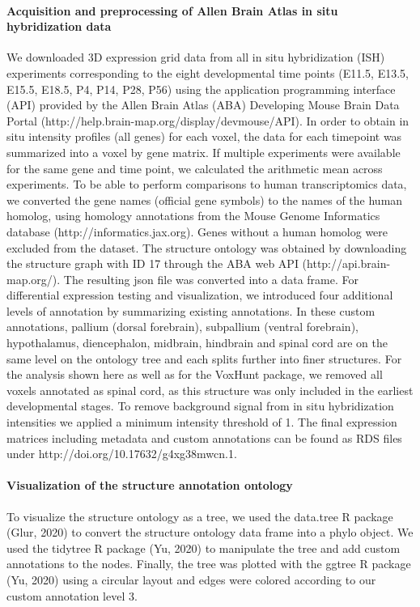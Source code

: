 \paragraph{Acquisition and preprocessing of Allen Brain Atlas in situ hybridization data}
We downloaded 3D expression grid data from all in situ hybridization (ISH) experiments corresponding to the eight developmental time points (E11.5, E13.5, E15.5, E18.5, P4, P14, P28, P56) using the application programming interface (API) provided by the Allen Brain Atlas (ABA) Developing Mouse Brain Data Portal (http://help.brain-map.org/display/devmouse/API). In order to obtain in situ intensity profiles (all genes) for each voxel, the data for each timepoint was summarized into a voxel by gene matrix. If multiple experiments were available for the same gene and time point, we calculated the arithmetic mean across experiments. To be able to perform comparisons to human transcriptomics data, we converted the gene names (official gene symbols) to the names of the human homolog, using homology annotations from the Mouse Genome Informatics database (http://informatics.jax.org). Genes without a human homolog were excluded from the dataset. The structure ontology was obtained by downloading the structure graph with ID 17 through the ABA web API (http://api.brain-map.org/). The resulting json file was converted into a data frame. For differential expression testing and visualization, we introduced four additional levels of annotation by summarizing existing annotations. In these custom annotations, pallium (dorsal forebrain), subpallium (ventral forebrain), hypothalamus, diencephalon, midbrain, hindbrain and spinal cord are on the same level on the ontology tree and each splits further into finer structures. For the analysis shown here as well as for the VoxHunt package, we removed all voxels annotated as spinal cord, as this structure was only included in the earliest developmental stages. To remove background signal from in situ hybridization intensities we applied a minimum intensity threshold of 1. The final expression matrices including metadata and custom annotations can be found as RDS files under http://doi.org/10.17632/g4xg38mwcn.1. 

\paragraph{Visualization of the structure annotation ontology}
To visualize the structure ontology as a tree, we used the data.tree R package (Glur, 2020) to convert the structure ontology data frame into a phylo object. We used the tidytree R package (Yu, 2020) to manipulate the tree and add custom annotations to the nodes. Finally, the tree was plotted with the ggtree R package (Yu, 2020) using a circular layout and edges were colored according to our custom annotation level 3. 
 
